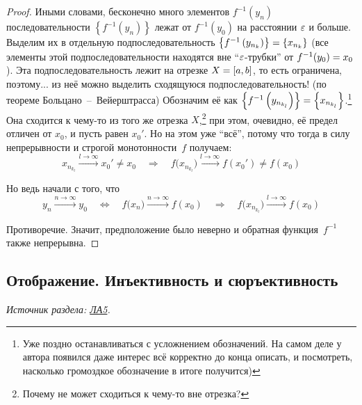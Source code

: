\documentclass[a4paper,12pt]{article}
\begin{document}
\begin{proof}
    Иными словами, бесконечно много элементов $f^{-1}(y_n)$ последовательности $\left\{f^{-1}(y_n)\right\}$ лежат от $f^{-1}(y_0)$ на расстоянии $\varepsilon$ и больше.
    Выделим их в отдельную подпоследовательность $\left\{f^{-1}\left(y_{n_k}\right)\right\} \hm= \left\{x_{n_k}\right\}$ (все элементы этой подпоследовательности находятся вне ``$\varepsilon$-трубки'' от $f^{-1}(y_0) \hm= x_0$).
    Эта подпоследовательность лежит на отрезке $X \hm= [a, b]$, то есть ограничена, поэтому... из неё можно выделить сходящуюся подпоследовательность! (по теореме Больцано~--~Вейерштрасса)
    Обозначим её как $\left\{f^{-1}\left(y_{n_{k_l}}\right)\right\} \hm= \left\{x_{n_{k_l}}\right\}$.\footnote{
      Уже поздно останавливаться с усложнением обозначений.
      На самом деле у автора появился даже интерес всё корректно до конца описать, и посмотреть, насколько громоздкое обозначение в итоге получится)
    }
    Она сходится к чему-то из того же отрезка $X$,\footnote{
      Почему не может сходиться к чему-то вне отрезка?
    }
    при этом, очевидно, её предел отличен от $x_0$, и пусть равен $x_0'$.
    Но на этом уже ``всё'', потому что тогда в силу непрерывности и строгой монотонности~$f$ получаем:
    \[
      x_{n_{k_l}} \xrightarrow{l \to \infty} x_0' \not= x_0
        \quad\Rightarrow\quad f\bigl(x_{n_{k_l}}\bigr) \xrightarrow{l \to \infty} f(x_0') \not= f(x_0)
    \]
    
    Но ведь начали с того, что
    \[
      y_n \xrightarrow{n \to\infty} y_0
        \quad\Leftrightarrow\quad f\bigl(x_{n}\bigr) \xrightarrow{n \to \infty} f(x_0)
        \quad\Rightarrow\quad f\bigl(x_{n_{k_l}}\bigr) \xrightarrow{l \to \infty} f(x_0)
    \]
    
    Противоречие.
    Значит, предположение было неверно и обратная функция~$f^{-1}$ также непрерывна.
  \end{proof}

  
  
  \subsection{Отображение. Инъективность и сюръективность}
  
  {
    \small
    \emph{Источник раздела: \href{https://github.com/Alvant/GeomeSeminare/tree/master2022/seminars/linalge/seminar05}{ЛА5}.}
  }
  
\end{document}
